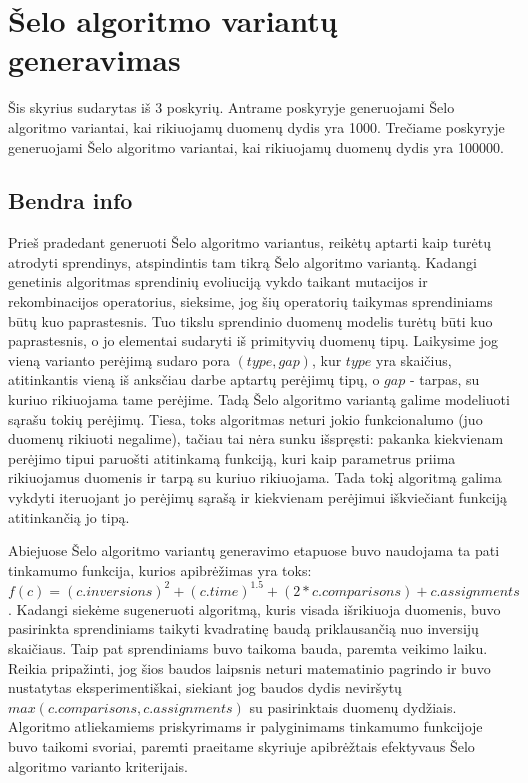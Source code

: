 \documentclass{VUMIFInfKursinis}
\begin{document}
\section{Šelo algoritmo variantų generavimas}

Šis skyrius sudarytas iš 3 poskyrių.
Antrame poskyryje generuojami Šelo algoritmo variantai, kai rikiuojamų duomenų dydis yra 1000.
Trečiame poskyryje generuojami Šelo algoritmo variantai, kai rikiuojamų duomenų dydis yra 100000.

\subsection{Bendra info} %

Prieš pradedant generuoti Šelo algoritmo variantus, reikėtų aptarti kaip turėtų atrodyti sprendinys, atspindintis tam tikrą Šelo algoritmo variantą.
Kadangi genetinis algoritmas sprendinių evoliuciją vykdo taikant mutacijos ir rekombinacijos operatorius, sieksime, jog šių operatorių taikymas sprendiniams būtų kuo paprastesnis.
Tuo tikslu sprendinio duomenų modelis turėtų būti kuo paprastesnis, o jo elementai sudaryti iš primityvių duomenų tipų.
Laikysime jog vieną varianto perėjimą sudaro pora $(type, gap)$, kur $type$ yra skaičius, atitinkantis vieną iš anksčiau darbe aptartų perėjimų tipų,
o $gap$ - tarpas, su kuriuo rikiuojama tame perėjime.
Tadą Šelo algoritmo variantą galime modeliuoti sąrašu tokių perėjimų.
Tiesa, toks algoritmas neturi jokio funkcionalumo (juo duomenų rikiuoti negalime), tačiau tai nėra sunku išspręsti: pakanka kiekvienam perėjimo tipui
paruošti atitinkamą funkciją, kuri kaip parametrus priima rikiuojamus duomenis ir tarpą su kuriuo rikiuojama.
Tada tokį algoritmą galima vykdyti iteruojant jo perėjimų sąrašą ir kiekvienam perėjimui iškviečiant funkciją atitinkančią jo tipą.


Abiejuose Šelo algoritmo variantų generavimo etapuose buvo naudojama ta pati tinkamumo funkcija, kurios apibrėžimas yra toks:
$f(c) = (c.inversions)^2 + (c.time)^{1.5} + (2*c.comparisons) + c.assignments$.
Kadangi siekėme sugeneruoti algoritmą, kuris visada išrikiuoja duomenis, buvo pasirinkta sprendiniams taikyti kvadratinę baudą priklausančią nuo inversijų skaičiaus.
Taip pat sprendiniams buvo taikoma bauda, paremta veikimo laiku. Reikia pripažinti, jog šios baudos laipsnis neturi matematinio pagrindo ir buvo nustatytas eksperimentiškai,
siekiant jog baudos dydis neviršytų $max(c.comparisons, c.assignments)$ su pasirinktais duomenų dydžiais.
Algoritmo atliekamiems priskyrimams ir palyginimams tinkamumo funkcijoje buvo taikomi svoriai, paremti
praeitame skyriuje apibrėžtais efektyvaus Šelo algoritmo varianto kriterijais. 
\end{document}
